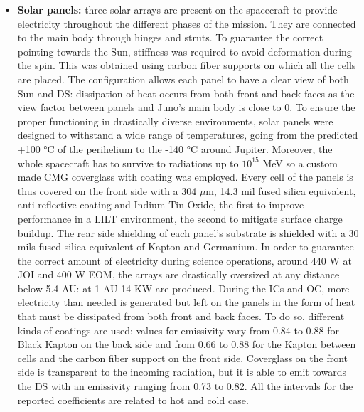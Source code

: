\begin{itemize}
    \item \textbf{Solar panels:} three solar arrays are present on the spacecraft to provide electricity throughout the different phases of the mission. They are connected to the main body through hinges and struts. To guarantee the correct pointing towards the Sun, stiffness was required to avoid deformation during the spin. This was obtained using carbon fiber supports on which all the cells are placed. The configuration allows each panel to have a clear view of both Sun and DS: dissipation of heat occurs from both front and back faces as the view factor between panels and Juno's main body is close to 0. 
    To ensure the proper functioning in drastically diverse environments, solar panels were designed to withstand a wide range of temperatures, going from the predicted +100 °C of the perihelium to the -140 °C around Jupiter\cite{solar_panels_coef}. Moreover, the whole spacecraft has to survive to radiations up to $10^{15}$ MeV so a custom made CMG coverglass with coating was employed. Every cell of the panels is thus covered on the front side with a 304 $\mu$m, 14.3 mil fused silica equivalent\cite{solar_panels_coef}, anti-reflective coating and Indium Tin Oxide, the first to improve performance in a LILT environment, the second to mitigate surface charge buildup\cite{solar_panels_coef}. The rear side shielding of each panel's substrate is shielded with a 30 mils fused silica equivalent of Kapton and Germanium. In order to guarantee the correct amount of electricity during science operations, around 440 W at JOI and 400 W EOM, the arrays are drastically oversized at any distance below 5.4 AU: at 1 AU 14 KW are produced. During the ICs and OC, more electricity than needed is generated but left on the panels in the form of heat that must be dissipated from both front and back faces. To do so, different kinds of coatings are used: %
    values for emissivity vary from 0.84 to 0.88 for Black Kapton on the back side and from 0.66 to 0.88 for the Kapton between cells and the carbon fiber support on the front side. Coverglass on the front side is transparent to the incoming radiation, but it is able to emit towards the DS with an emissivity ranging from 0.73 to 0.82. All the intervals for the reported coefficients are related to hot and cold case\cite{solar_panels_coef}.
\end{itemize}